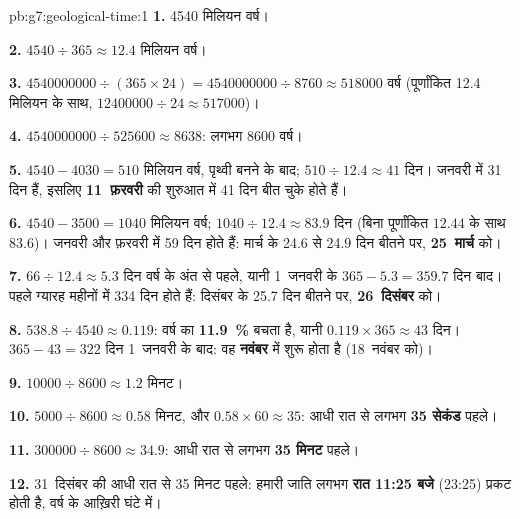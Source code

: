 \begin{solution}{pb:g7:geological-time:1}
\textbf{1.} \num{4540} मिलियन वर्ष।

\textbf{2.} $4540 \div 365 \approx 12.4$ मिलियन वर्ष।

\textbf{3.} $\num{4540000000} \div (365 \times 24) = \num{4540000000}
\div 8760 \approx \num{518000}$
वर्ष (पूर्णांकित \num{12.4} मिलियन के साथ,
$\num{12400000} \div 24 \approx \num{517000}$)।

\textbf{4.} $\num{4540000000} \div \num{525600} \approx 8638$: लगभग
\num{8600} वर्ष।

\textbf{5.} $4540 - 4030 = 510$ मिलियन वर्ष, पृथ्वी बनने के बाद;
$510 \div 12.4 \approx 41$ दिन। जनवरी में 31 दिन हैं, इसलिए \textbf{11~फ़रवरी}
की शुरुआत में 41 दिन बीत चुके होते हैं।

\textbf{6.} $4540 - 3500 = 1040$ मिलियन वर्ष; $1040 \div 12.4 \approx
83.9$
दिन (बिना पूर्णांकित $12.44$ के साथ 83.6)। जनवरी और फ़रवरी में 59 दिन होते हैं:
मार्च के 24.6 से 24.9 दिन बीतने पर, \textbf{25~मार्च} को।

\textbf{7.} $66 \div 12.4 \approx 5.3$ दिन वर्ष के अंत से पहले, यानी
1~जनवरी के $365 - 5.3 = 359.7$ दिन बाद। पहले ग्यारह महीनों में 334 दिन होते हैं:
दिसंबर के 25.7 दिन बीतने पर, \textbf{26~दिसंबर} को।

\textbf{8.} $538.8 \div 4540 \approx 0.119$: वर्ष का \textbf{11.9~\%} बचता है,
यानी $0.119 \times 365 \approx 43$ दिन। $365 - 43 =
322$ दिन 1~जनवरी के बाद:
वह \textbf{नवंबर} में शुरू होता है (18~नवंबर
को)।

\textbf{9.} $\num{10000} \div 8600 \approx 1.2$ मिनट।

\textbf{10.} $5000 \div 8600 \approx 0.58$ मिनट, और $0.58 \times 60
\approx 35$:
आधी रात से लगभग \textbf{35 सेकंड} पहले।

\textbf{11.} $\num{300000} \div 8600 \approx 34.9$: आधी रात से लगभग \textbf{35
मिनट} पहले।

\textbf{12.} 31~दिसंबर की आधी रात से 35 मिनट पहले: हमारी जाति लगभग
\textbf{रात 11:25 बजे} (23:25) प्रकट होती है, वर्ष के आख़िरी घंटे में।
\end{solution}
